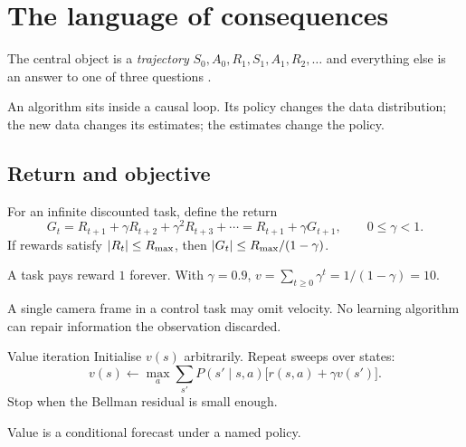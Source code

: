 \chapter{The language of consequences}
\label{ch:first}

The central object is a \emph{trajectory} $S_0,A_0,R_1,S_1,A_1,R_2,\ldots$ and everything
else is an answer to one of three questions \cite{suttonbarto2018}.

\begin{mentalmodel}
An algorithm sits inside a causal loop. Its policy changes the data distribution; the new
data changes its estimates; the estimates change the policy.
\end{mentalmodel}

\section{Return and objective}

For an infinite discounted task, define the return
\[
  G_t=R_{t+1}+\gamma R_{t+2}+\gamma^2R_{t+3}+\cdots=R_{t+1}+\gamma G_{t+1},
  \qquad 0\leq\gamma<1.
\]
If rewards satisfy $\left\lvert R_t\right\rvert\leq R_{\max}$, then $\left\lvert G_t\right\rvert\leq R_{\max}/(1-\gamma)$.

\begin{example}
A task pays reward $1$ forever. With $\gamma=0.9$,
$v=\sum_{t\geq0}\gamma^t=1/(1-\gamma)=10$.
\end{example}

\begin{failuremode}
A single camera frame in a control task may omit velocity. No learning algorithm can
repair information the observation discarded.
\end{failuremode}

\begin{algorithm}{Value iteration}
Initialise $v(s)$ arbitrarily. Repeat sweeps over states:
\[
  v(s)\leftarrow\max_a\sum_{s'}P(s'\mid s,a)\bigl[r(s,a)+\gamma v(s')\bigr].
\]
Stop when the Bellman residual is small enough.
\end{algorithm}


\begin{takeaway}
Value is a conditional forecast under a named policy.
\end{takeaway}

